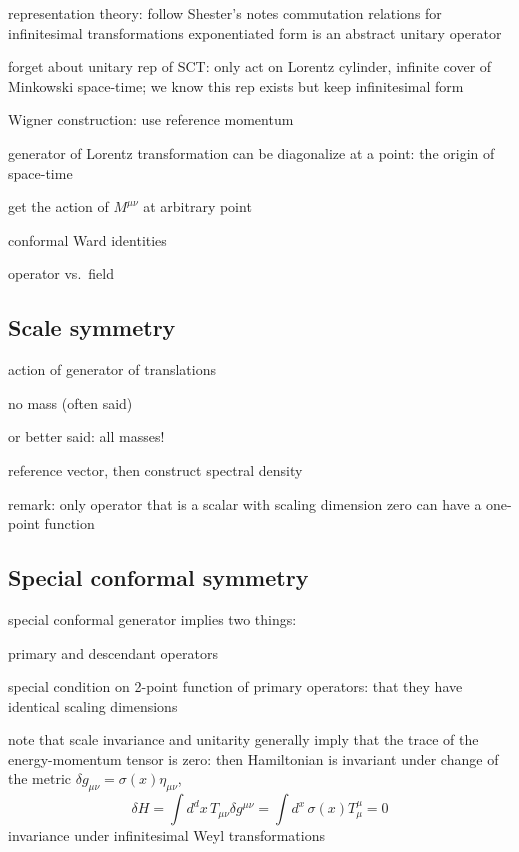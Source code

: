 \documentclass[a4paper,12pt]{article}
\numberwithin{equation}{section}
\begin{document}
representation theory: follow Shester's notes
commutation relations for infinitesimal transformations
exponentiated form is an abstract unitary operator

forget about unitary rep of SCT: only act on Lorentz cylinder, infinite cover of Minkowski space-time; we know this rep exists
but keep infinitesimal form




Wigner construction: use reference momentum


generator of Lorentz transformation can be diagonalize at a point: the origin of space-time

get the action of $M^{\mu\nu}$ at arbitrary point



conformal Ward identities




operator vs.~field

\subsection{Scale symmetry}

action of generator of translations

no mass (often said)

or better said: all masses!

reference vector, then construct spectral density


remark: only operator that is a scalar with scaling dimension zero can have a one-point function



\subsection{Special conformal symmetry}

special conformal generator implies two things:

primary and descendant operators

special condition on 2-point function of primary operators: that they have identical scaling dimensions



note that scale invariance and unitarity generally imply that the trace of the energy-momentum tensor is zero: then Hamiltonian is invariant under change of the metric $\delta g_{\mu\nu} = \sigma(x) \eta_{\mu\nu}$,
\begin{equation}
	\delta H = \int d^dx \, T_{\mu\nu} \delta g^{\mu\nu}
	= \int d^x \, \sigma(x) T^\mu_\mu = 0
\end{equation}
invariance under infinitesimal Weyl transformations 
\end{document}
